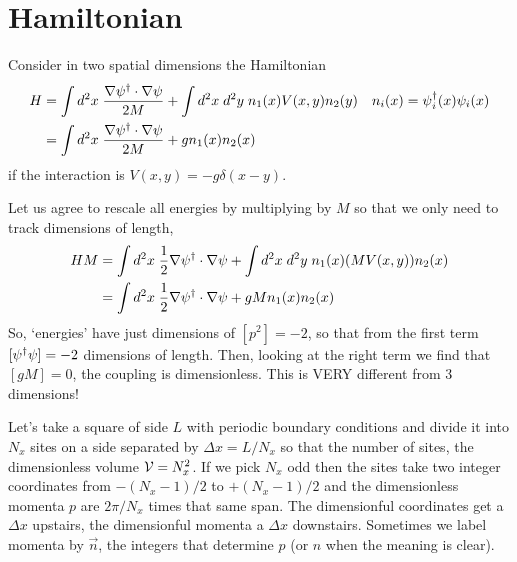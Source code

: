 \section{Hamiltonian}\label{sec:hamiltonian}

Consider in two spatial dimensions the Hamiltonian
\begin{align}
	H
	&= \int d^2x\; \frac{\nabla \psi{}^{\dagger} \cdot \nabla \psi}{2M} + \int d^2x\; d^2y\; n_1(x) V(x,y) n_2(y)
	&
	n_i(x) &= \psi{}^{\dagger}_i(x) \psi_i(x)
	\\
	&= \int d^2x\; \frac{\nabla \psi{}^{\dagger} \cdot \nabla \psi}{2M} + g n_1(x) n_2(x)
\end{align}
if the interaction is $V(x,y) = -g \delta(x-y)$.

Let us agree to rescale all energies by multiplying by $M$ so that we only need to track dimensions of length,
\begin{align}
	HM
	&= \int d^2x\; \frac{1}{2} \nabla \psi{}^{\dagger} \cdot \nabla \psi + \int d^2x\; d^2y\; n_1(x) (MV(x,y)) n_2(x)
	\\
	&= \int d^2x\; \frac{1}{2} \nabla \psi{}^{\dagger} \cdot \nabla \psi + gM n_1(x) n_2(x)
\end{align}
So, `energies' have just dimensions of $[p^2] = -2$, so that from the first term $[\psi{}^{\dagger}\psi] = -2$ dimensions of length.
Then, looking at the right term we find that $[gM] = 0$, the coupling is dimensionless.
This is VERY different from 3 dimensions!

Let's take a square of side $L$ with periodic boundary conditions and divide it into $N_x$ sites on a side separated by $\Delta x = L/N_x$ so that the number of sites, the dimensionless volume $\mathcal{V}=N_x^2$.
If we pick $N_x$ odd then the sites take two integer coordinates from $-(N_x-1)/2$ to $+(N_x-1)/2$ and the dimensionless momenta $p$ are $2\pi / N_x$ times that same span.
The dimensionful coordinates get a $\Delta x$ upstairs, the dimensionful momenta a $\Delta x$ downstairs.
Sometimes we label momenta by $\vec{n}$, the integers that determine $p$ (or $n$ when the meaning is clear).

